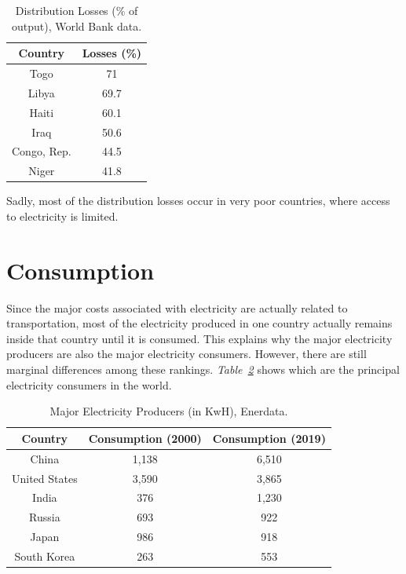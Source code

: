 \documentclass[a4paper,12pt]{book}
\begin{document}
\begin{table}[tb]
\begin{center}
\begin{tabular}{|c|c|}
\hline
Country & Losses (\%)\\
\hline
Togo & 71\\
Libya & 69.7\\
Haiti & 60.1\\
Iraq & 50.6\\
Congo, Rep. & 44.5\\
Niger & 41.8\\
\hline
\end{tabular}
\caption{Distribution Losses (\% of output), World Bank data.}
\label{fig:losses}
\end{center}
\end{table}

Sadly, most of the distribution losses occur in very poor countries, where access to electricity is limited. 

\section{Consumption}

Since the major costs associated with electricity are actually related to transportation, most of the electricity produced in one country actually remains inside that country until it is consumed. This explains why the major electricity producers are also the major electricity consumers. However, there are still marginal differences among these rankings. \textit{Table~\ref{Tab:producers}} shows which are the principal electricity consumers in the world.

\begin{table}[tb]
\begin{center}
\begin{tabular}{|c|c|c|}
\hline
Country & Consumption (2000) & Consumption (2019)\\
\hline
China & 1,138 & 6,510\\
United States & 3,590 & 3,865\\
India & 376 & 1,230\\
Russia & 693 & 922\\
Japan & 986 & 918\\
South Korea & 263 & 553\\
\hline
\end{tabular}
\caption{Major Electricity Producers (in KwH), Enerdata.}
\label{Tab:producers}
\end{center}
\end{table}
\end{document}
